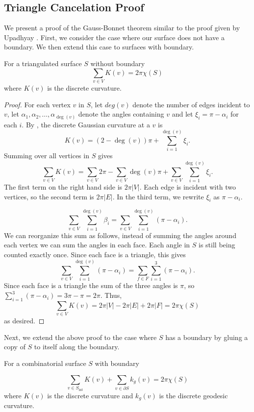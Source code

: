 \subsection{Triangle Cancelation Proof}
\label{sec:proof}


We present a proof of the Gauss-Bonnet theorem similar to the proof given by Upadhyay \cite{upadhyay2015}.
First, we consider the case where our surface does not have a boundary.
We then extend this case to surfaces with boundary.
\begin{theorem}\label{thm:g-b-discete-bdy}
For a triangulated surface $S$ without boundary
$$\sum_{v\in V} K(v)=2\pi \chi(S)$$
where $K(v)$ is the discrete curvature.
\end{theorem}

\begin{proof}

For each vertex $v$ in $S$,
let $deg(v)$ denote the number of edges incident to $v$, let $\alpha_1,\alpha_2,\ldots,\alpha_{\deg{(v)}}$ denote the angles
containing $v$ and let $\xi_i=\pi-\alpha_i$ for each $i$.
By , 
the discrete Gaussian curvature at a $v$ is
 $$K(v)=(2-\deg{(v)})\pi +\sum_{i=1}^{\deg{(v)}} \xi_i.$$
Summing over all vertices in $S$ gives
$$\sum_{v\in V} K(v)=\sum_{v\in V}2\pi - \sum_{v\in V}\deg{(v)}\pi+\sum_{v\in V}\sum_{i=1}^{\deg{(v)}} \xi_i.$$
The first term on the right hand side is $2\pi |V|$. Each edge is incident with two vertices, so the second term is $2\pi |E|$. 
In the third term, we rewrite $\xi_i$ as $\pi-\alpha_i$.

$$ \sum_{v\in V}\sum_{i=1}^{\deg{(v)}} \beta_i= \sum_{v\in V}\sum_{i=1}^{\deg{(v)}} (\pi-\alpha_i).$$
We can reorganize this sum as follows, instead of summing the angles around each vertex we can sum the angles in each face.
Each angle in $S$ is still being counted exactly once. 
Since each face is a triangle, this gives
$$\sum_{v\in V}\sum_{i=1}^{\deg{(v)}} (\pi-\alpha_i)=\sum_{f\in F}\sum_{i=1}^3(\pi-\alpha_i).$$
Since each face is a triangle the sum of the three angles is $\pi$,
so $\sum_{i=1}^3(\pi-\alpha_i)=3\pi-\pi=2\pi.$
Thus, $$\sum_{v\in V} K(v)=2\pi |V|-2\pi |E|+2\pi |F|=2\pi \chi(S)$$ as desired.
\end{proof}

Next, we extend the above proof to the case where $S$ has a boundary
by gluing a copy of $S$ to itself along the boundary.

\begin{theorem}\label{thm:g-b-discete}
For a combinatorial surface $S$ with boundary

$$\sum_{v\in S_{\text{int}}} K(v)+\sum_{v\in\partial S}k_g(v)=2\pi \chi(S)$$
where $K(v)$ is the discrete curvature and $k_g(v)$ is the discrete geodesic curvature.
\end{theorem}

